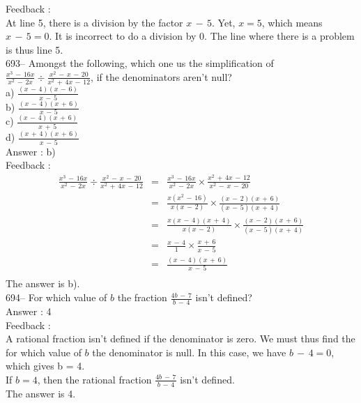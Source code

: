 \documentclass[letterpaper, 12pt]{article}
\begin{document}
Feedback : \\
At line 5, there is a division by the factor $x\,-\,5$.  Yet, $x=5$, which means $x\,-\,5=0$. 
It is incorrect to do a division by 0.
The line where there is a problem is thus line 5.\\

693-- Amongst the following, which one us the simplification of $\frac{x^{3}\,-\,16x}{x^{2}\,-\,2x}\div
\frac{x^{2}\,-\,x\,-\,20}{x^{2}\,+\,4x\,-\,12}$, if the denominators aren't null?\\
a) $\frac{(x\,-\,4)(x\,-\,6)}{x\,-\,5}$\\[2mm]
b) $\frac{(x\,-\,4)(x\,+\,6)}{x\,-\,5}$\\[2mm]
c) $\frac{(x\,-\,4)(x\,+\,6)}{x\,+\,5}$\\[2mm]
d) $\frac{(x\,+\,4)(x\,+\,6)}{x\,-\,5}$\\

Answer : b)\\

Feedback : \\
\begin{eqnarray*}
\frac{x^{3}\,-\,16x}{x^{2}\,-\,2x}\div
\frac{x^{2}\,-\,x\,-\,20}{x^{2}\,+\,4x\,-\,12}&=&\frac{x^{3}\,-\,16x}{x^{2}\,-\,2x}\times\frac{x^{2}\,+\,4x\,-\,12}{x^{2}\,-\,x\,-\,20}\\[2mm]
&=&\frac{x(x^{2}\,-\,16)}{x(x\,-\,2)}\times
\frac{(x\,-\,2)(x\,+\,6)}{(x\,-\,5)(x\,+\,4)}\\[2mm]
&=&\frac{x(x\,-\,4)(x\,+\,4)}{x(x\,-\,2)}\times\frac{(x\,-\,2)(x\,+\,6)}{(x\,-\,5)(x\,+\,4)}\\[2mm]
&=&\frac{x\,-\,4}{1}\times \frac{x\,+\,6}{x\,-\,5}\\[2mm]
&=&\frac{(x\,-\,4)(x\,+\,6)}{x\,-\,5}\\[2mm]
\end{eqnarray*}
The answer is b).\\

694-- For which value of $b$ the fraction $\frac{4b\,-\,7}{b\,-\,4}$
isn't defined?\\

Answer : 4\\

Feedback : \\
A rational fraction isn't defined if the denominator is zero.
We must thus find the for which value of $b$ the denominator is null.
In this case, we have $b\,-\,4=0$, which gives b = 4.\\

If $b=4$, then the rational fraction $\frac{4b\,-\,7}{b\,-\,4}$ isn't defined.\\
The answer is 4.\\
\end{document}
